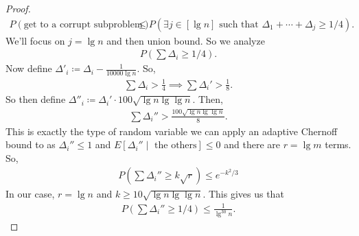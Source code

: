 \documentclass{report}
\begin{document}
\begin{proof}
\begin{align*}
        P(\text{get to a corrupt subproblem}) &\leq P(\text{$\exists j \in [\lg n]$ such that $\Delta_1 + \cdots + \Delta_j \geq 1/4$}).
    \end{align*}
    We'll focus on $j = \lg n$ and then union bound. So we analyze
    \begin{align*}
        P(\sum \Delta_i \geq 1/4).
    \end{align*}
    Now define $\Delta'_i \coloneq \Delta_i - \frac{1}{10000\lg n}$. So,
    \begin{align*}
        \sum \Delta_i > \frac 14 \implies \sum \Delta_i' > \frac 18.
    \end{align*}
    So then define $\Delta''_i \coloneq \Delta_i' \cdot 100\sqrt{\lg n \lg \lg n}$. Then,
    \begin{align*}
        \sum \Delta_i'' > \frac{100 \sqrt{\lg n\lg \lg n}}{8}.
    \end{align*}
    This is exactly the type of random variable we can apply an adaptive Chernoff bound to as $\Delta_i'' \leq 1$ and $E[\Delta_i'' \mid \text{ the others}] \leq 0$ and there are $r = \lg m$ terms. So,
    \begin{align*}
        P(\sum \Delta_i'' \geq k\sqrt r) \leq e^{-k^2/3}
    \end{align*}
    In our case, $r = \lg n$ and $k \geq 10 \sqrt{\lg n \lg \lg n}$. This gives us that 
    \begin{align*}
        P(\sum \Delta_i'' \geq 1/4) \leq \frac{1}{\lg^{30}n}.
    \end{align*}
\end{proof}
\newpage
\end{document}
